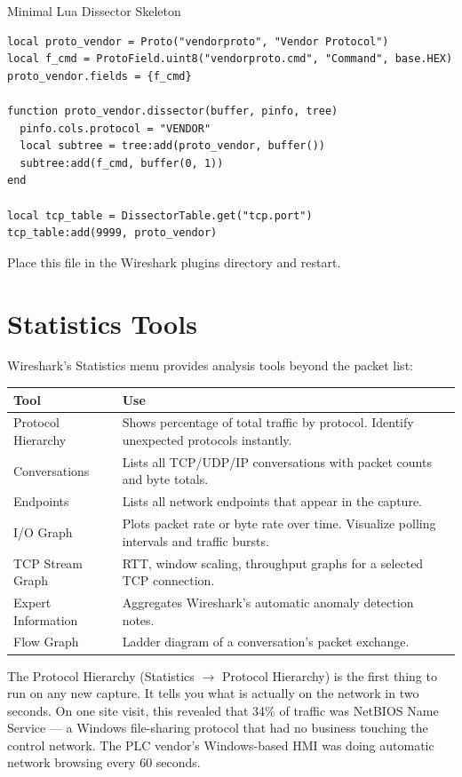 \documentclass[12pt,twoside,openright]{memoir}
\begin{document}
\begin{example}{Minimal Lua Dissector Skeleton}
\begin{lstlisting}
local proto_vendor = Proto("vendorproto", "Vendor Protocol")
local f_cmd = ProtoField.uint8("vendorproto.cmd", "Command", base.HEX)
proto_vendor.fields = {f_cmd}

function proto_vendor.dissector(buffer, pinfo, tree)
  pinfo.cols.protocol = "VENDOR"
  local subtree = tree:add(proto_vendor, buffer())
  subtree:add(f_cmd, buffer(0, 1))
end

local tcp_table = DissectorTable.get("tcp.port")
tcp_table:add(9999, proto_vendor)
\end{lstlisting}
Place this file in the Wireshark plugins directory and restart.
\end{example}

\section{Statistics Tools}

Wireshark's Statistics menu provides analysis tools beyond the packet list:

\begin{center}
\begin{tabular}{L{4cm}L{8cm}}
\toprule
{}
\textbf{Tool} & \textbf{Use} \\
\midrule
Protocol Hierarchy & Shows percentage of total traffic by protocol. Identify unexpected protocols instantly. \\
Conversations & Lists all TCP/UDP/IP conversations with packet counts and byte totals. \\
Endpoints & Lists all network endpoints that appear in the capture. \\
I/O Graph & Plots packet rate or byte rate over time. Visualize polling intervals and traffic bursts. \\
TCP Stream Graph & RTT, window scaling, throughput graphs for a selected TCP connection. \\
Expert Information & Aggregates Wireshark's automatic anomaly detection notes. \\
Flow Graph & Ladder diagram of a conversation's packet exchange. \\
\bottomrule
\end{tabular}
\end{center}

\begin{fieldnote}
The Protocol Hierarchy (Statistics $\to$ Protocol Hierarchy) is the first thing to run on any new capture. It tells you what is actually on the network in two seconds. On one site visit, this revealed that 34\% of traffic was NetBIOS Name Service --- a Windows file-sharing protocol that had no business touching the control network. The PLC vendor's Windows-based HMI was doing automatic network browsing every 60 seconds.
\end{fieldnote}
\end{document}
